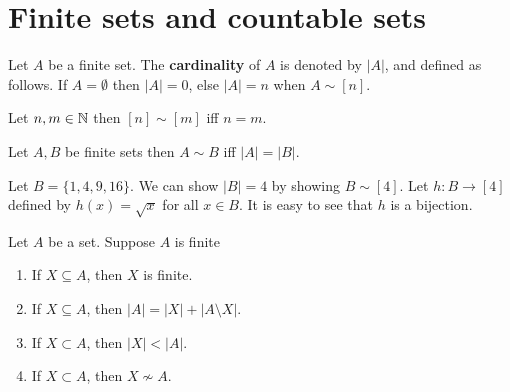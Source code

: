 \documentclass[a4paper,english,12pt]{article}   	%
\begin{document}
\section{Finite sets and countable sets}
\begin{defn} Let $A$ be a finite set. The \textbf{cardinality} of $A$ is denoted by $|A|$, and defined as follows. If $A= \emptyset$ then $|A|=0$, else $|A|=n$ when $A \sim [n]$.
\end{defn}
\begin{lem} Let $n,m \in \mathbb{N}$ then $[n] \sim [m]$ iff $n=m$.
\end{lem}
\begin{cor}\label{Cor:EqCard} Let $A,B$ be finite sets then $A \sim B$ iff $|A|=|B|$.
\end{cor}
\begin{exmp} Let $B = \{1,4,9,16\}$. We can show $|B| = 4$ by showing $B \sim [4]$. Let $h: B \to [4]$ defined by $h(x) = \sqrt{x}$ for all $x \in B$. It is easy to see that $h$ is a bijection.
\end{exmp}
\begin{thm} Let $A$ be a set. Suppose $A$ is finite
\begin{enumerate}[i$\_$]
\item If $X \subseteq A$, then $X$ is finite.
\item If $X \subseteq A$, then $|A|=|X|+|A \setminus X|$.
\item If $X \subset A$, then $|X|<|A|$.
\item If $X \subset A$, then $X \nsim A$.
\end{enumerate}
\end{thm}
\end{document}
